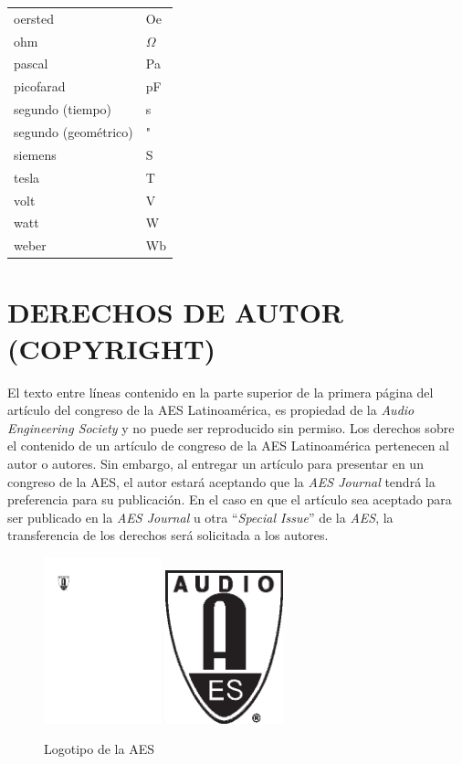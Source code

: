 \documentclass
  [ams,pdfout]%
	{aeslac}
\begin{document}
\begin{table}[!ht]
\begin{tabular}{ll}
oersted           		&	Oe\\
ohm                		&	$\Omega$\\
pascal             		&	Pa\\
picofarad          		&	pF\\
segundo (tiempo)      		&	s\\
segundo (geométrico)    	&	"\\
siemens            		&	S\\
tesla              		&	T\\
volt               		&	V\\
watt               		&	W\\
weber              		&	Wb\\
\end{tabular}
\end{table}
%
\section{DERECHOS DE AUTOR (COPYRIGHT)}

El texto entre líneas contenido en la parte superior de la primera página del artículo del congreso de la AES Latinoamérica, es propiedad de la \emph{Audio Engineering Society} y no puede ser reproducido sin permiso. Los derechos sobre el contenido de un artículo de congreso de la AES Latinoamérica pertenecen al autor o autores. Sin embargo, al entregar un artículo para presentar en un congreso de la AES, el autor estará aceptando que la \emph{AES Journal} tendrá la preferencia para su publicación. En el caso en que el artículo sea aceptado para ser publicado en la \emph{AES Journal} u otra ``\emph{Special Issue}'' de la \emph{AES}, la transferencia de los derechos será solicitada a los autores.
%


\begin{figure}[h!]
  \centering
	\ifpdfout
	    \includegraphics[width=3.4cm]{aeslogo.pdf}%
	\else
	    \includegraphics[width=3.4cm]{aeslogo.eps}%
	\fi
  \caption{Logotipo de la AES}
  \label{fig:logo}
\end{figure}
\end{document}
